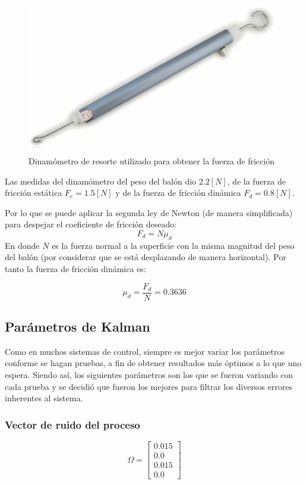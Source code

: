 \begin{figure}
\centering
\includegraphics[scale=0.4]{images/dynamometer.jpg}
\caption{Dinamómetro de resorte utilizado para obtener la fuerza de fricción}
\label{fig:dynamometer}
\end{figure}	

	Las medidas del dinamómetro del peso del balón dio $2.2[N]$, de la fuerza de fricción estática $F_{e} = 1.5[N]$ y de la fuerza de fricción dinámica $F_{d} = 0.8[N]$. 

	Por lo que se puede aplicar la segunda ley de Newton (de manera simplificada) para despejar el coeficiente de fricción deseado:
\begin{equation}
F_d = N\mu_d 
\end{equation}
	En donde $N$ es la fuerza normal a la superficie con la misma magnitud del peso del balón (por considerar que se está desplazando de manera horizontal). Por tanto la fuerza de fricción dinámica es:
	
\begin{equation}
	\mu_d = \frac{F_d}{N}
	      = 0.3636		
\end{equation}
	
		\subsection*{Parámetros de Kalman}
		Como en muchos sistemas de control, siempre es mejor variar los parámetros conforme se hagan pruebas, a fin de obtener resultados más óptimos a lo que uno espera. Siendo así, los siguientes parámetros son los que se fueron variando con cada prueba y se decidió que fueron los mejores para filtrar los diversos errores inherentes al sistema. 
		
		\subsubsection*{Vector de ruido del proceso}
\begin{equation}
\Omega = \begin{bmatrix}
0.015	\\ 
0.0\\ 
0.015\\ 
0.0
\end{bmatrix}
\label{eq:process_noise_vector}
\end{equation}

